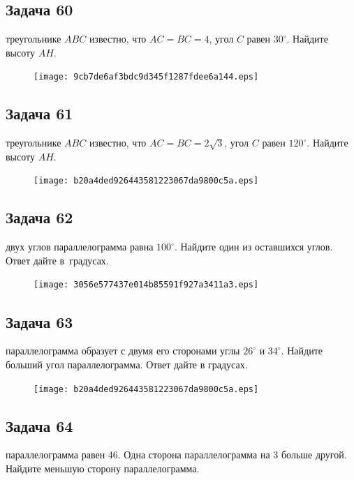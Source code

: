 \documentclass[a4paper,10pt]{article} %
\begin{document}
\begin{spacing}{1.0}
{\subsection*{Задача 60}
 треугольнике $ABC$ известно, что ${AC=BC=4}$, угол $C$ равен $30^\circ$. Найдите высоту $AH$. 
\vspace{1.5cm}

\begin{figure}{\texttt{[image: 9cb7de6af3bdc9d345f1287fdee6a144.eps]}}\end{figure}
\subsection*{Задача 61}
 треугольнике $ABC$ известно, что ${AC=BC=2\sqrt{3}}$, угол $C$ равен $120^\circ$. Найдите высоту $AH$. 

\vspace{1.5cm}

\begin{figure}{\texttt{[image: b20a4ded926443581223067da9800c5a.eps]}}\end{figure}
\subsection*{Задача 62}
 двух углов параллелограмма равна $100^\circ$. Найдите один из оставшихся углов. Ответ дайте в~градусах.

\vspace{1.5cm}

\begin{figure}{\texttt{[image: 3056e577437e014b85591f927a3411a3.eps]}}\end{figure}
\subsection*{Задача 63}
 параллелограмма образует с двумя его сторонами углы $26^\circ$ и $34^\circ$. Найдите больший угол параллелограмма. Ответ дайте в градусах. 

\vspace{1.5cm}

\begin{figure}{\texttt{[image: b20a4ded926443581223067da9800c5a.eps]}}\end{figure}
\subsection*{Задача 64}
 параллелограмма равен 46. Одна сторона параллелограмма на 3 больше другой. Найдите меньшую сторону параллелограмма.

}
\end{spacing}
\end{document}
